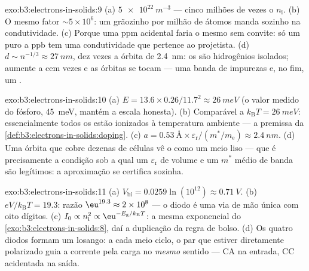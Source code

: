 \begin{solution}{exo:b3:electrons-in-solids:9}
(a) $\qty{5e22}{m^{-3}}$ --- cinco milhões de vezes o $n_{\text{i}}$.
(b) O mesmo fator $\sim5\times10^6$: um grãozinho por milhão de
átomos manda sozinho na condutividade. (c) Porque uma ppm acidental
faria o mesmo sem convite: só um  puro a ppb tem uma
condutividade que pertence ao projetista. (d) $d \sim n^{-1/3}
\approx \qty{27}{nm}$, dez vezes a órbita de \qty{2.4}{nm}: os 
são hidrogênios isolados; aumente a  cem vezes e as
órbitas se tocam --- uma banda de impurezas e, no fim, um .
\end{solution}

\begin{solution}{exo:b3:electrons-in-solids:10}
(a) $E = 13.6\times0.26/11.7^2 \approx \qty{26}{meV}$ (o
valor medido do fósforo, \qty{45}{meV}, mantém a escala
honesta). (b) Comparável a $k_{\text{B}}T = \qty{26}{meV}$:
essencialmente todos os  estão ionizados à temperatura ambiente ---
a premissa da \cref{def:b3:electrons-in-solids:doping}. (c) $a =
\qty{0.53}{\angstrom}\times\varepsilon_{\text{r}}/(m^*/
m_{\text{e}}) \approx \qty{2.4}{nm}$. (d) Uma órbita que cobre
dezenas de células vê o  como um meio liso --- que é
precisamente a condição sob a qual um $\varepsilon_{\text{r}}$ de volume
e um $m^*$ médio de banda são legítimos:
a aproximação se certifica sozinha.
\end{solution}

\begin{solution}{exo:b3:electrons-in-solids:11}
(a) $V_{\text{bi}} = 0.0259\ln(10^{12}) \approx \qty{0.71}{V}$.
(b) $eV/k_{\text{B}}T = 19.3$: razão $\eu^{19.3} \approx
2\times10^{8}$ --- o diodo é uma via de mão única com oito
dígitos. (c) $I_0 \propto n_{\text{i}}^2 \propto
\eu^{-E_{\text{g}}/k_{\text{B}}T}$: a mesma exponencial do
\cref{exo:b3:electrons-in-solids:8}, daí a
duplicação da regra de bolso. (d) Os quatro diodos formam um losango: a
cada meio ciclo, o par que estiver diretamente polarizado guia a corrente
pela carga no \emph{mesmo} sentido --- CA na entrada, CC
acidentada na saída.
\end{solution}

